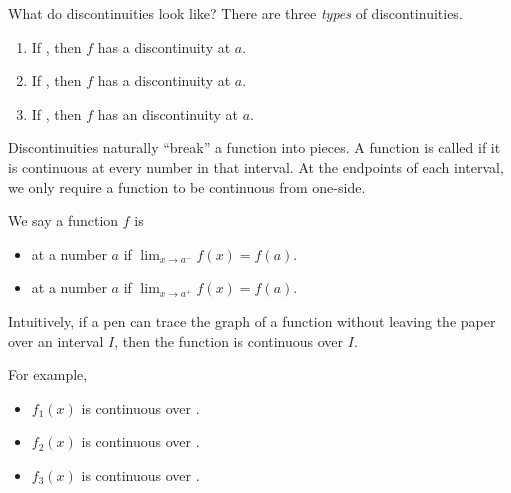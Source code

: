 \documentclass[../main.tex]{subfiles}
\begin{document}
  What do discontinuities look like? There are three \emph{types} of discontinuities.

  \begin{figure}[h]  %
    \centering
    
    \label{fig:discontinuities}
  \end{figure}

  \begin{enumerate}[itemsep={3ex}]
    \item If \underline{\hspace{3in}}, then \(f\) has a  discontinuity at \(a\).
    \item If \underline{\hspace{3in}}, then \(f\) has a  discontinuity at \(a\).
    \item If \underline{\hspace{3in}}, then \(f\) has an  discontinuity at \(a\).
  \end{enumerate}

  Discontinuities naturally ``break'' a function into pieces.
  A function is called  if it is continuous at every number in that interval. At the endpoints of each interval, we only require a function to be continuous from one-side.

  We say a function \(f\) is 
  \begin{itemize}
    \item {} at a number \(a\) if \(\lim_{{x \to a^{-}}} f(x) = f(a)\).
    \item {} at a number \(a\) if \(\lim_{{x \to a^{+}}} f(x) = f(a)\).
  \end{itemize}

  Intuitively, if a pen can trace the graph of a function without leaving the paper over an interval \(I\), then the function is continuous over \(I\).

  For example, 
  \begin{itemize}[itemsep={3ex}]
    \item \(f_{1}(x)\) is continuous over \underline{\hspace{2in}}.
    \item \(f_{2}(x)\) is continuous over \underline{\hspace{2in}}.
    \item \(f_{3}(x)\) is continuous over \underline{\hspace{2in}}.
  \end{itemize}
  \vfill{}
  \clearpage
\end{document}
